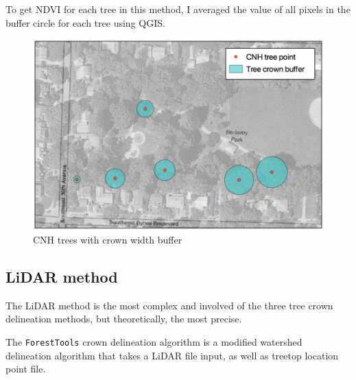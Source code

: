 \documentclass[12pt,twoside]{reedthesis}
\begin{document}
To get NDVI for each tree in this method, I averaged the value of all pixels in the buffer circle for each tree using QGIS.
\begin{figure}

{\centering \includegraphics[width=1\linewidth]{figure/point_radius} 

}

\caption{CNH trees with crown width buffer}\label{fig:point-radius}
\end{figure}
\hypertarget{lidar-method}{%
\subsection{LiDAR method}\label{lidar-method}}

The LiDAR method is the most complex and involved of the three tree crown delineation methods, but theoretically, the most precise.

The \texttt{ForestTools} crown delineation algorithm is a modified watershed delineation algorithm that takes a LiDAR file input, as well as treetop location point file.
\end{document}
